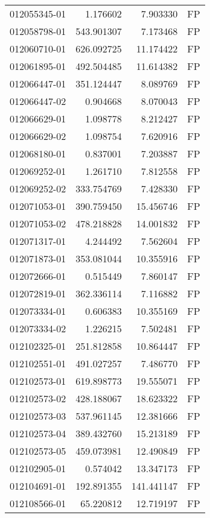 \begin{tabular}{lrrl}
012055345-01 &    1.176602 &     7.903330 &   FP \\
012058798-01 &  543.901307 &     7.173468 &   FP \\
012060710-01 &  626.092725 &    11.174422 &   FP \\
012061895-01 &  492.504485 &    11.614382 &   FP \\
012066447-01 &  351.124447 &     8.089769 &   FP \\
012066447-02 &    0.904668 &     8.070043 &   FP \\
012066629-01 &    1.098778 &     8.212427 &   FP \\
012066629-02 &    1.098754 &     7.620916 &   FP \\
012068180-01 &    0.837001 &     7.203887 &   FP \\
012069252-01 &    1.261710 &     7.812558 &   FP \\
012069252-02 &  333.754769 &     7.428330 &   FP \\
012071053-01 &  390.759450 &    15.456746 &   FP \\
012071053-02 &  478.218828 &    14.001832 &   FP \\
012071317-01 &    4.244492 &     7.562604 &   FP \\
012071873-01 &  353.081044 &    10.355916 &   FP \\
012072666-01 &    0.515449 &     7.860147 &   FP \\
012072819-01 &  362.336114 &     7.116882 &   FP \\
012073334-01 &    0.606383 &    10.355169 &   FP \\
012073334-02 &    1.226215 &     7.502481 &   FP \\
012102325-01 &  251.812858 &    10.864447 &   FP \\
012102551-01 &  491.027257 &     7.486770 &   FP \\
012102573-01 &  619.898773 &    19.555071 &   FP \\
012102573-02 &  428.188067 &    18.623322 &   FP \\
012102573-03 &  537.961145 &    12.381666 &   FP \\
012102573-04 &  389.432760 &    15.213189 &   FP \\
012102573-05 &  459.073981 &    12.490849 &   FP \\
012102905-01 &    0.574042 &    13.347173 &   FP \\
012104691-01 &  192.891355 &   141.441147 &   FP \\
012108566-01 &   65.220812 &    12.719197 &   FP \\

\end{tabular}
